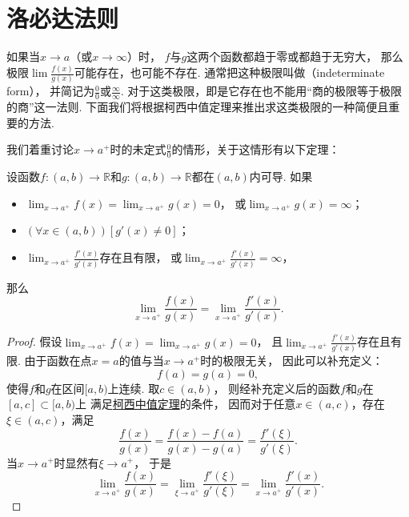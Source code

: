 \section{洛必达法则}
如果当\(x \to a\)（或\(x \to \infty\)）时，
\(f\)与\(g\)这两个函数都趋于零或都趋于无穷大，
那么极限\(\lim\frac{f(x)}{g(x)}\)可能存在，也可能不存在.
通常把这种极限叫做（indeterminate form），
并简记为\(\frac{0}{0}\)或\(\frac{\infty}{\infty}\).
对于这类极限，即是它存在也不能用“商的极限等于极限的商”这一法则.
下面我们将根据柯西中值定理来推出求这类极限的一种简便且重要的方法.

我们着重讨论\(x \to a^+\)时的未定式\(\frac{0}{0}\)的情形，关于这情形有以下定理：
\begin{theorem}[洛必达法则]\label{theorem:微分中值定理.洛必达法则1}
设函数\(f\colon(a,b)\to\mathbb{R}\)和\(g\colon(a,b)\to\mathbb{R}\)都在\((a,b)\)内可导.
如果\begin{itemize}
	\item \(\lim_{x \to a^+} f(x) = \lim_{x \to a^+} g(x) = 0\)，
	或\(\lim_{x \to a^+} g(x) = \infty\)；
	\item \((\forall x \in (a,b))[g'(x) \neq 0]\)；
	\item \(\lim_{x \to a^+} \frac{f'(x)}{g'(x)}\)存在且有限，
	或\(\lim_{x \to a^+} \frac{f'(x)}{g'(x)} = \infty\)，
\end{itemize}
那么\[
	\lim_{x \to a^+} \frac{f(x)}{g(x)}
	= \lim_{x \to a^+} \frac{f'(x)}{g'(x)}.
\]
\begin{proof}
假设\(\lim_{x \to a^+} f(x) = \lim_{x \to a^+} g(x) = 0\)，
且\(\lim_{x \to a^+} \frac{f'(x)}{g'(x)}\)存在且有限.
由于函数在点\(x=a\)的值与当\(x \to a^+\)时的极限无关，
因此可以补充定义：\[
	f(a) = g(a) = 0,
\]
使得\(f\)和\(g\)在区间\([a,b)\)上连续.
取\(c\in(a,b)\)，
则经补充定义后的函数\(f\)和\(g\)在\([a,c]\subset[a,b)\)上
满足\hyperref[theorem:微分中值定理.柯西中值定理]{柯西中值定理}的条件，
因而对于任意\(x\in(a,c)\)，存在\(\xi\in(a,c)\)，满足\[
	\frac{f(x)}{g(x)}
	= \frac{f(x)-f(a)}{g(x)-g(a)}
	= \frac{f'(\xi)}{g'(\xi)}.
\]
当\(x \to a^+\)时显然有\(\xi \to a^+\)，
于是\[
	\lim_{x \to a^+} \frac{f(x)}{g(x)}
	= \lim_{\xi \to a^+} \frac{f'(\xi)}{g'(\xi)}
	= \lim_{x \to a^+} \frac{f'(x)}{g'(x)}.
\]


\end{proof}
\end{theorem}
